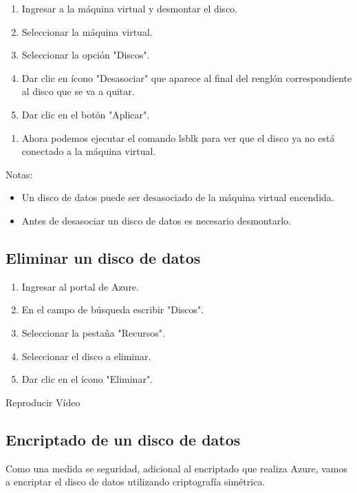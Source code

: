 \begin{enumerate}
\item Ingresar a la máquina virtual y desmontar el disco.
\item Seleccionar la máquina virtual.
\item Seleccionar la opción "Discos".
\item Dar clic en ícono "Desasociar" que aparece al final del renglón correspondiente al disco que se va a quitar.
\item Dar clic en el botón "Aplicar".
\end{enumerate}

\begin{enumerate}
\item Ahora podemos ejecutar el comando lsblk para ver que el disco ya no está conectado a la máquina virtual.
\end{enumerate}

Notas:

\begin{itemize}
\item Un disco de datos puede ser desasociado de la máquina virtual encendida.
\item Antes de desasociar un disco de datos es necesario desmontarlo.
\end{itemize}

\subsection{Eliminar un disco de datos}

\begin{enumerate}
\item Ingresar al portal de Azure.
\item En el campo de búsqueda escribir "Discos".
\item Seleccionar la pestaña "Recursos".
\item Seleccionar el disco a eliminar.
\item Dar clic en el ícono "Eliminar".
\end{enumerate}

Reproducir Vídeo

\subsection{Encriptado de un disco de datos}

Como una medida se seguridad, adicional al encriptado que realiza Azure, vamos a encriptar el disco de datos utilizando criptografía simétrica.

